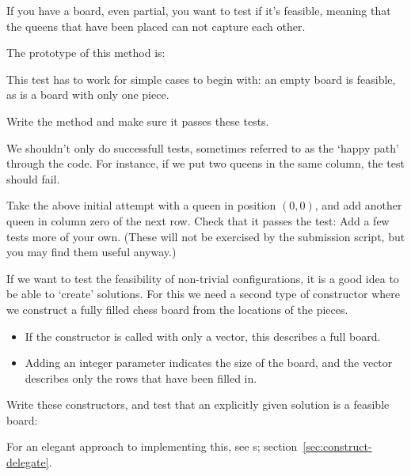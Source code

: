 If you have a board,
even partial,
you want to test if it's feasible,
meaning that the queens that have been placed can not capture each other.

The prototype of this method is:

This test has to work for simple cases to begin with:
an empty board is feasible, as is a board with only one piece.

\begin{exercise}
  Write the method and make sure it passes these tests.
\end{exercise}

We shouldn't only do successfull tests,
sometimes referred to as the `happy path' through the code.
For instance,
if we put two queens in the same column, the test should fail.

\begin{exercise}
  Take the above initial attempt with a queen in position $(0,0)$,
  and add another queen in column zero of the next row.
  Check that it passes the test:
  Add a few tests more of your own.
  (These will not be exercised by the submission script,
  but you may find them useful anyway.)
\end{exercise}


If we want to test the feasibility of non-trivial configurations,
it is a good idea to be able to `create' solutions.
For this we need a second type of constructor
where we construct a fully filled chess board
from the locations of the pieces.
%
\begin{itemize}
\item If the constructor is called with only a vector, this describes a full board.
\item Adding an integer parameter indicates the size of the board,
  and the vector describes only the rows that have been filled in.
\end{itemize}

\begin{exercise}
  Write these constructors, and
  test that an explicitly given solution is a feasible board:
\end{exercise}

For an elegant approach to implementing this,
see s; section~\ref{sec:construct-delegate}.

